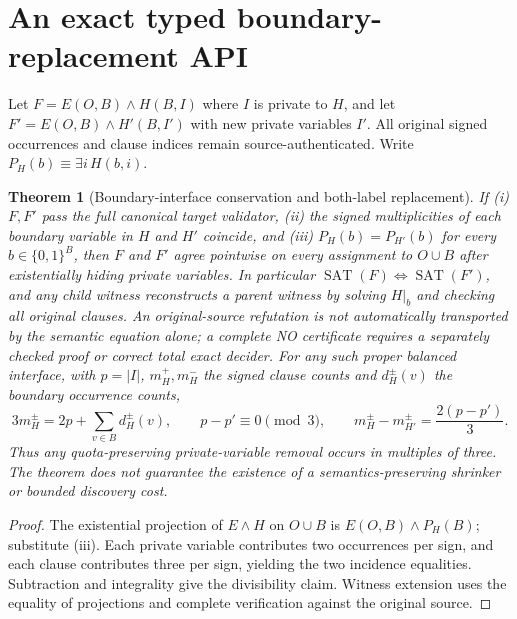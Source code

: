 \documentclass[11pt]{article}
\newtheorem{theorem}{Theorem}
\begin{document}
\section{An exact typed boundary-replacement API}
Let $F=E(O,B)\wedge H(B,I)$ where $I$ is private to $H$, and let $F'=E(O,B)\wedge H'(B,I')$ with new private variables $I'$. All original signed occurrences and clause indices remain source-authenticated. Write $P_H(b)\equiv\exists i\,H(b,i)$.
\begin{theorem}[Boundary-interface conservation and both-label replacement]
If (i) $F,F'$ pass the full canonical target validator, (ii) the signed multiplicities of each boundary variable in $H$ and $H'$ coincide, and (iii) $P_H(b)=P_{H'}(b)$ for \emph{every} $b\in\{0,1\}^{B}$, then $F$ and $F'$ agree pointwise on every assignment to $O\cup B$ after existentially hiding private variables. In particular $\operatorname{SAT}(F)\Leftrightarrow\operatorname{SAT}(F')$, and any child witness reconstructs a parent witness by solving $H|_b$ and checking all original clauses. An original-source refutation is not automatically transported by the semantic equation alone; a complete NO certificate requires a separately checked proof or correct total exact decider.
For any such proper balanced interface, with $p=|I|$, $m_H^+,m_H^-$ the signed clause counts and $d_H^{\pm}(v)$ the boundary occurrence counts,
\[
  3m_H^{\pm}=2p+\sum_{v\in B}d_H^{\pm}(v),\qquad
  p-p'\equiv0\pmod 3,\qquad
  m_H^{\pm}-m_{H'}^{\pm}=\frac{2(p-p')}{3}.
\]
Thus any quota-preserving private-variable removal occurs in multiples of three. The theorem does not guarantee the existence of a semantics-preserving shrinker or bounded discovery cost.
\end{theorem}
\begin{proof}The existential projection of $E\wedge H$ on $O\cup B$ is $E(O,B)\wedge P_H(B)$; substitute (iii). Each private variable contributes two occurrences per sign, and each clause contributes three per sign, yielding the two incidence equalities. Subtraction and integrality give the divisibility claim. Witness extension uses the equality of projections and complete verification against the original source.\end{proof}
\end{document}
